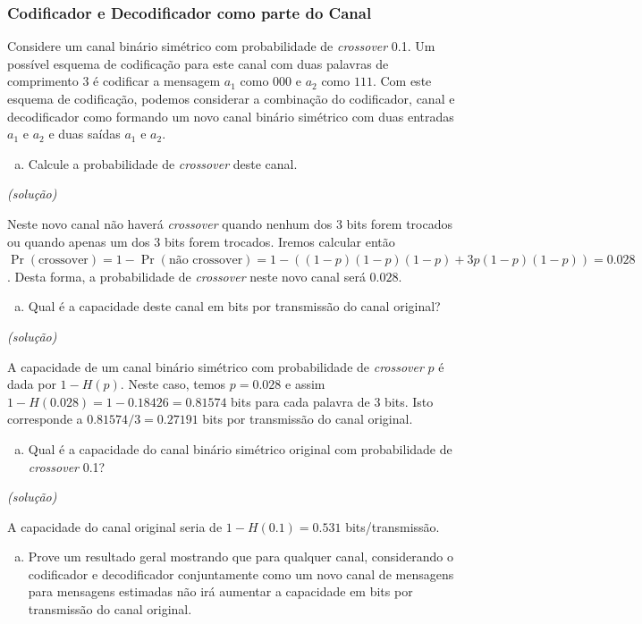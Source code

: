 \begin{frame}[allowframebreaks]
  \frametitle{Codificador e Decodificador como parte do Canal}
  \begin{exercise}
  Considere um canal binário simétrico com probabilidade de \emph{crossover} 0.1.
  Um possível esquema de codificação para este canal com duas palavras de 
  comprimento 3 é codificar a mensagem $a_1$ como $000$ e $a_2$ como $111$.
  Com este esquema de codificação, podemos considerar a combinação do codificador,
  canal e decodificador como formando um novo canal binário simétrico com duas 
  entradas $a_1$ e $a_2$ e duas saídas $a_1$ e $a_2$.

  \examplebreak
  \begin{enumerate}[a)]
  \item Calcule a probabilidade de \emph{crossover} deste canal.
  \end{enumerate}
  \textit{(solução)}

  Neste novo canal não haverá \emph{crossover} quando nenhum dos 3 bits forem trocados
  ou quando apenas um dos 3 bits forem trocados. Iremos calcular então
  $\Pr(\text{crossover}) = 1 - \Pr(\text{não crossover}) = 1 - ( (1-p)(1-p)(1-p) + 3p(1-p)(1-p) ) = 0.028$. Desta forma, a probabilidade de \emph{crossover} neste novo canal
  será $0.028$. 


  \examplebreak
  \begin{enumerate}[b)]
  \item Qual é a capacidade deste canal em bits por transmissão do canal original?
  \end{enumerate}
  \textit{(solução)}

  A capacidade de um canal binário simétrico com probabilidade de \emph{crossover}
  $p$ é dada por $1 - H(p)$. Neste caso, temos $p=0.028$ e assim
  $1 - H(0.028) = 1 - 0.18426 = 0.81574$ bits para cada palavra de 3 bits. Isto 
  corresponde a $0.81574/3 = 0.27191$ bits por transmissão do canal original.
 
  \examplebreak
  \begin{enumerate}[c)]
  \item Qual é a capacidade do canal binário simétrico original com probabilidade
  de \emph{crossover} 0.1?
  \end{enumerate}
  \textit{(solução)}

  A capacidade do canal original seria de $1 - H(0.1) = 0.531$ bits/transmissão.


  \examplebreak
  \begin{enumerate}[d)]
  \item Prove um resultado geral mostrando que para qualquer canal, considerando o
  codificador e decodificador conjuntamente como um novo canal de mensagens para
  mensagens estimadas não irá aumentar a capacidade em bits por transmissão do
  canal original.
  \end{enumerate}


\end{exercise}
\end{frame}
